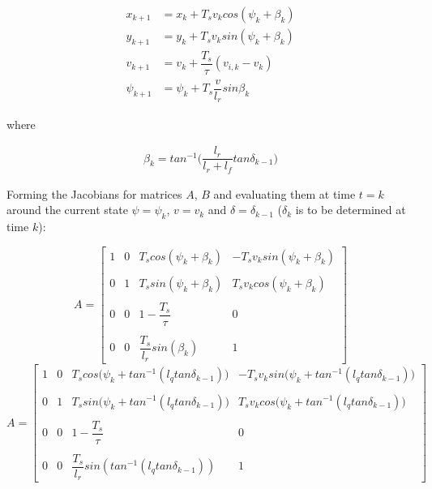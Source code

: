 \begin{align}
  x_{k+1} &= x_{k} + T_s v_k cos(\psi_k + \beta_k) \\
  y_{k+1} &= y_{k} + T_s v_k sin(\psi_k + \beta_k) \\
  v_{k+1} &= v_{k} + \dfrac{T_s}{\tau} (v_{i,k} - v_{k}) \\
  \psi_{k+1} &= \psi_{k} + T_s \dfrac{v}{l_r} sin\beta_k
\end{align}

where

\begin{align}
  \beta_k = tan^{-1}\Big(\dfrac{l_r}{l_r + l_f} tan\delta_{k-1}\Big)
\end{align}


Forming the Jacobians for matrices $A$, $B$ and evaluating them at time
$t=k$ around the current state $\psi = \psi_k$, $v = v_k$ and
$\delta = \delta_{k-1}$ ($\delta_k$ is to be determined at time $k$):

\begin{equation}
 A =
  \begin{bmatrix}
    1 & 0 & T_s cos(\psi_k + \beta_k) & -T_s v_k sin(\psi_k + \beta_k) \\\\
    0 & 1 & T_s sin(\psi_k + \beta_k) & T_s v_k cos(\psi_k + \beta_k) \\\\
    0 & 0 & 1-\dfrac{T_s}{\tau} & 0 \\\\
    0 & 0 & \dfrac{T_s}{l_r}sin(\beta_k) & 1
  \end{bmatrix}
\end{equation}
\begin{equation}
  A =
  \begin{bmatrix}
    1 & 0 & T_s cos\Big(\psi_k + tan^{-1} (l_q tan\delta_{k-1})\Big) & -T_s v_k sin\Big(\psi_k + tan^{-1} (l_q tan\delta_{k-1})\Big) \\\\
    0 & 1 & T_s sin\Big(\psi_k + tan^{-1} (l_q tan\delta_{k-1})\Big) & T_s v_k cos\Big(\psi_k + tan^{-1} (l_q tan\delta_{k-1})\Big) \\\\
    0 & 0 & 1-\dfrac{T_s}{\tau} & 0 \\\\
    0 & 0 & \dfrac{T_s}{l_r}sin(tan^{-1} (l_q tan\delta_{k-1})) & 1
  \end{bmatrix}
\end{equation}


